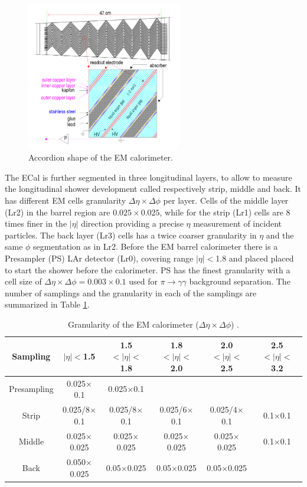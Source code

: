 \begin{figure}[H]
    \centering
    \includegraphics[width=0.6\textwidth]{Ch2/Img/ECal_accord.png}
    \caption{Accordion shape of the EM calorimeter.}
    \label{fig:chap2:ATLAS:Calo:ECal:Acc}
\end{figure}
The ECal is further segmented in three longitudinal layers, to allow to measure the longitudinal shower development called respectively strip, middle and back. It has different EM cells granularity $\Delta\eta\times\Delta\phi$ per layer. Cells of the middle layer (Lr2) in the barrel region are $0.025\times0.025$, while for the strip (Lr1) cells are 8 times finer in the $|\eta|$ direction providing a precise $\eta$ measurement of incident particles. The back layer (Lr3) cells has a twice coarser granularity in $\eta$ and the same $\phi$ segmentation as in Lr2. Before the EM barrel calorimeter there is a Presampler (PS) LAr detector (Lr0), covering range $|\eta|<$1.8 and placed placed to start the shower before the calorimeter. PS has the finest granularity with a cell size of $\Delta\eta\times\Delta\phi = 0.003\times0.1$ used for $\pi\rightarrow\gamma\gamma$ background separation. The number of samplings  and the granularity in each of the samplings are summarized in Table \ref{tab:chap2:ATLAS:Calo:ECal:Gr}.
\begin{table}[ht]
    \centering
    \begin{tabular}{cccccc}
    \hline
    Sampling & $|\eta|<$1.5 & 1.5$<|\eta|<$1.8 & 1.8$<|\eta|<$2.0 & 2.0$<|\eta|<$2.5 & 2.5$<|\eta|<$3.2 \\
    \hline
    \hline
        Presampling & 0.025$\times$0.1 & 0.025$\times$0.1  \\
        Strip & 0.025/8$\times$0.1 & 0.025/8$\times$0.1 & 0.025/6$\times$0.1 & 0.025/4$\times$0.1 & 0.1$\times$0.1 \\
        Middle & 0.025$\times$0.025 & 0.025$\times$0.025 & 0.025$\times$0.025 & 0.025$\times$0.025 & 0.1$\times$0.1 \\
        Back & 0.050$\times$0.025 & 0.05$\times$0.025 & 0.05$\times$0.025 & 0.05$\times$0.025 \\
        \hline
    \end{tabular}
    \caption{Granularity of the EM calorimeter ($\Delta\eta\times\Delta\phi$) \cite{LAr_TRD}.}
    \label{tab:chap2:ATLAS:Calo:ECal:Gr}
\end{table}
